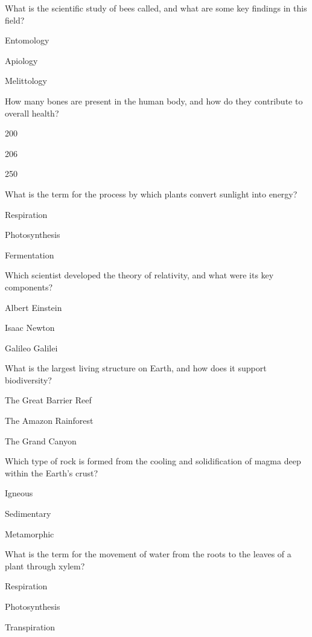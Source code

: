 \begin{enhancedmcq}{What is the scientific study of bees called, and what are some key findings in this field?}
\item Entomology
\item Apiology
\item Melittology

\end{enhancedmcq}
\begin{enhancedmcq}{How many bones are present in the human body, and how do they contribute to overall health?}
\item 200
\item 206
\item 250

\end{enhancedmcq}
\begin{enhancedmcq}{What is the term for the process by which plants convert sunlight into energy?}
\item Respiration
\item Photosynthesis
\item Fermentation

\end{enhancedmcq}
\begin{enhancedmcq}{Which scientist developed the theory of relativity, and what were its key components?}
\item Albert Einstein
\item Isaac Newton
\item Galileo Galilei

\end{enhancedmcq}
\begin{enhancedmcq}{What is the largest living structure on Earth, and how does it support biodiversity?}
\item The Great Barrier Reef
\item The Amazon Rainforest
\item The Grand Canyon

\end{enhancedmcq}
\begin{enhancedmcq}{Which type of rock is formed from the cooling and solidification of magma deep within the Earth's crust?}
\item Igneous
\item Sedimentary
\item Metamorphic

\end{enhancedmcq}
\begin{enhancedmcq}{What is the term for the movement of water from the roots to the leaves of a plant through xylem?}
\item Respiration
\item Photosynthesis
\item Transpiration

\end{enhancedmcq}
